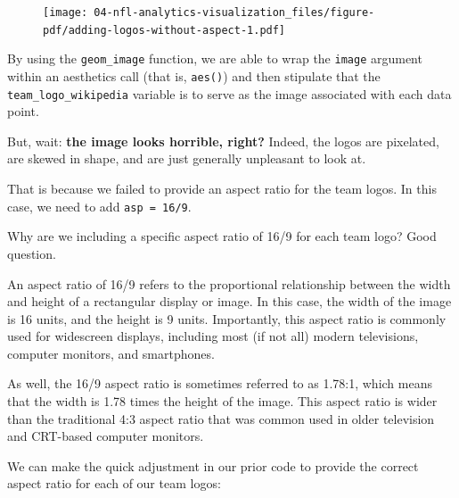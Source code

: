 \documentclass[
  letterpaper,
]{krantz}
\begin{document}
\begin{figure}[H]

{\centering \texttt{[image: 04-nfl-analytics-visualization\_files/figure-pdf/adding-logos-without-aspect-1.pdf]}

}

\end{figure}

By using the \texttt{geom\_image} function, we are able to wrap the
\texttt{image} argument within an aesthetics call (that is,
\texttt{aes()}) and then stipulate that the
\texttt{team\_logo\_wikipedia} variable is to serve as the image
associated with each data point.

But, wait: \textbf{the image looks horrible, right?} Indeed, the logos
are pixelated, are skewed in shape, and are just generally unpleasant to
look at.

That is because we failed to provide an aspect ratio for the team logos.
In this case, we need to add \texttt{asp\ =\ 16/9}.

\begin{tcolorbox}[enhanced jigsaw, colback=white, leftrule=.75mm, breakable, colframe=quarto-callout-note-color-frame, bottomtitle=1mm, rightrule=.15mm, left=2mm, opacityback=0, bottomrule=.15mm, arc=.35mm, coltitle=black, colbacktitle=quarto-callout-note-color!10!white, toptitle=1mm, titlerule=0mm, title=\textcolor{quarto-callout-note-color}{\faInfo}\hspace{0.5em}{Note}, toprule=.15mm, opacitybacktitle=0.6]

Why are we including a specific aspect ratio of 16/9 for each team logo?
Good question.

An aspect ratio of 16/9 refers to the proportional relationship between
the width and height of a rectangular display or image. In this case,
the width of the image is 16 units, and the height is 9 units.
Importantly, this aspect ratio is commonly used for widescreen displays,
including most (if not all) modern televisions, computer monitors, and
smartphones.

As well, the 16/9 aspect ratio is sometimes referred to as 1.78:1, which
means that the width is 1.78 times the height of the image. This aspect
ratio is wider than the traditional 4:3 aspect ratio that was common
used in older television and CRT-based computer monitors.

\end{tcolorbox}

We can make the quick adjustment in our prior code to provide the
correct aspect ratio for each of our team logos:
\end{document}
